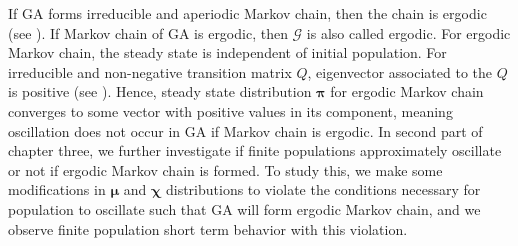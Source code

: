 If GA forms irreducible and aperiodic Markov chain, then the chain is ergodic (see \cite{MarkovChain}). If Markov chain of GA is ergodic, then $\mathcal{G}$ is also called ergodic. For ergodic Markov chain, the steady state is independent of initial population. For irreducible and non-negative transition matrix $Q$, eigenvector associated to the $Q$ is positive (see \cite{Minc1988}). Hence, steady state distribution $\bm{\pi}$ for ergodic Markov chain converges to some vector with positive values in its component, meaning oscillation does not occur in GA if Markov chain is ergodic. In second part of chapter three, we further investigate if finite populations approximately oscillate or not if ergodic Markov chain is formed. To study this, we make some modifications in $\bm{\mu}$ and $\bm{\chi}$ distributions to  violate the conditions necessary for population to oscillate such that GA will form ergodic Markov chain, and we observe finite population short term behavior with this violation.


% 






